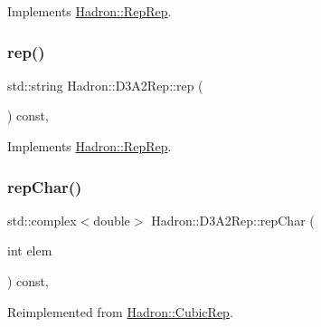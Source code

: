 Implements \mbox{\hyperlink{structHadron_1_1RepRep_ab3213025f6de249f7095892109575fde}{Hadron\+::\+Rep\+Rep}}.

\mbox{\label{structHadron_1_1D3A2Rep_a068031a95b51a3bb6b3219e51de41db2}} 
\subsubsection{\texorpdfstring{rep()}{rep()}\hspace{0.1cm}{\footnotesize\ttfamily [3/3]}}
{\footnotesize\ttfamily std\+::string Hadron\+::\+D3\+A2\+Rep\+::rep (\begin{DoxyParamCaption}{ }\end{DoxyParamCaption}) const\hspace{0.3cm}{\ttfamily [inline]}, {\ttfamily [virtual]}}



Implements \mbox{\hyperlink{structHadron_1_1RepRep_ab3213025f6de249f7095892109575fde}{Hadron\+::\+Rep\+Rep}}.

\mbox{\label{structHadron_1_1D3A2Rep_a89c199bea81c3c1da8687a5cbd7498c0}} 
\subsubsection{\texorpdfstring{repChar()}{repChar()}\hspace{0.1cm}{\footnotesize\ttfamily [1/2]}}
{\footnotesize\ttfamily std\+::complex$<$double$>$ Hadron\+::\+D3\+A2\+Rep\+::rep\+Char (\begin{DoxyParamCaption}\item[{int}]{elem }\end{DoxyParamCaption}) const\hspace{0.3cm}{\ttfamily [inline]}, {\ttfamily [virtual]}}



Reimplemented from \mbox{\hyperlink{structHadron_1_1CubicRep_af45227106e8e715e84b0af69cd3b36f8}{Hadron\+::\+Cubic\+Rep}}.

